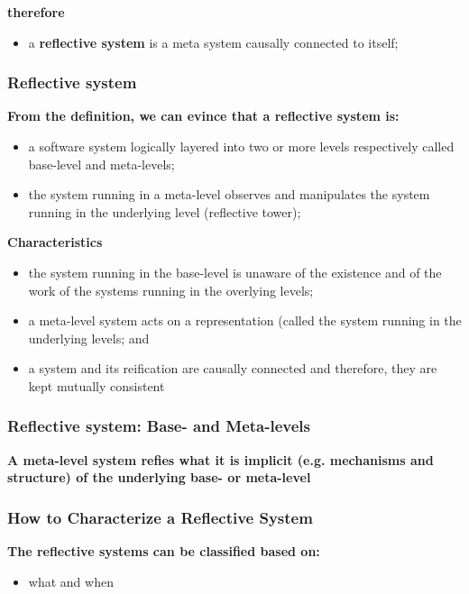 \textbf{therefore}
\begin{itemize}
	\item a \textbf{reflective system} is a meta system causally connected to itself;
\end{itemize}

\subsubsection{Reflective system}

\textbf{From the definition, we can evince that a reflective system is:}
\begin{itemize}
	\item a software system logically layered into two or more levels respectively called base-level and meta-levels;
	\item the system running in a meta-level observes and manipulates the system running in the underlying level (reflective tower);
\end{itemize}

\textbf{Characteristics}
\begin{itemize}
	\item the system running in the base-level is unaware of the existence and of the work of the systems running in the overlying levels;
	\item a meta-level system acts on a representation (called the system running in the underlying levels; and
	\item a system and its reification are causally connected and therefore, they are kept mutually consistent
\end{itemize}

\subsubsection{Reflective system: Base- and Meta-levels}

\textbf{A meta-level system refies what it is implicit (e.g. mechanisms and structure) of the underlying base- or meta-level}

\subsubsection{How to Characterize a Reflective System}

\textbf{The reflective systems can be classified based on:}
\begin{itemize}
	\item what and when
\end{itemize}

